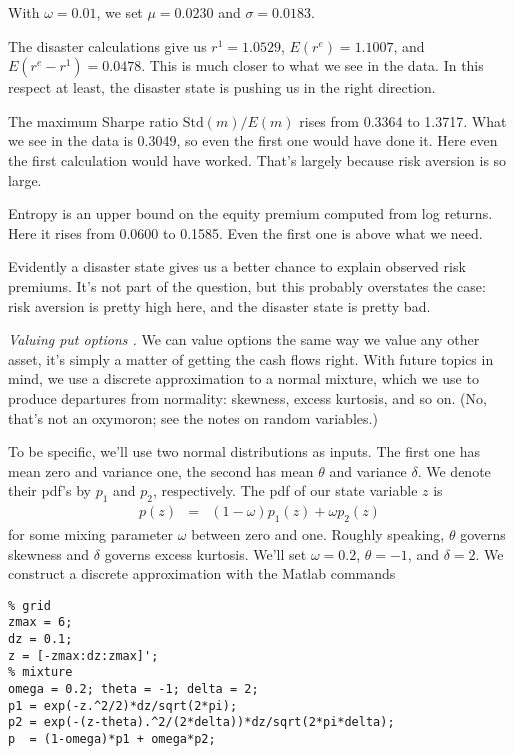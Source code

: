 \documentclass[11pt]{exam}
\begin{document}
\begin{questions}
\begin{solution}
\begin{parts}
\item With $\omega = 0.01$, we set
$ \mu = 0.0230$ and $\sigma = 0.0183$.


\item The disaster calculations give us
$r^1 = 1.0529$,
$ E(r^e) = 1.1007$, and $ E(r^e-r^1) = 0.0478$.
This is much closer to what we see in the data.
In this respect at least, the disaster state is pushing us in the right direction.

\item
The maximum Sharpe ratio $ \mbox{Std}(m)/E(m)$ rises from 0.3364 to 1.3717.
What we see in the data is 0.3049, so even the first one would have done it.
Here even the first calculation would have worked.
That's largely because risk aversion is so large.

\item Entropy is an upper bound on the equity premium computed from log returns.
Here it rises from 0.0600 to 0.1585.
Even the first one is above what we need.

\item Evidently a disaster state gives us a better chance to
explain observed risk premiums.
It's not part of the question, but this probably overstates the case:
risk aversion is pretty high here, and the disaster state is pretty bad.
\end{parts}
\end{solution}


\item {\it Valuing put options .\/}
We can value options the same way we value any other asset,
it's simply a matter of getting the cash flows right.
With future topics in mind,
we use a discrete approximation to a normal mixture,
which we use to produce departures from normality: skewness, excess kurtosis, and so on.
(No, that's not an oxymoron; see the notes on random variables.)

To be specific, we'll use two normal distributions as inputs.
The first one has mean zero and variance one,
the second has mean $\theta$ and variance $\delta$.
We denote their pdf's by $p_1$ and $p_2$, respectively.
The pdf of our state variable $z$ is
\begin{eqnarray*}
    p(z) &=& (1-\omega) p_1(z) + \omega p_2(z)
\end{eqnarray*}
for some mixing parameter $\omega$ between zero and one.
Roughly speaking, $\theta$ governs skewness and $\delta$ governs excess kurtosis.
We'll set $\omega = 0.2$, $\theta = -1$, and $\delta = 2$.
%
We construct a discrete approximation with the Matlab commands
\begin{verbatim}
% grid
zmax = 6;
dz = 0.1;
z = [-zmax:dz:zmax]';
% mixture
omega = 0.2; theta = -1; delta = 2;
p1 = exp(-z.^2/2)*dz/sqrt(2*pi);
p2 = exp(-(z-theta).^2/(2*delta))*dz/sqrt(2*pi*delta);
p  = (1-omega)*p1 + omega*p2;
\end{verbatim}



\end{questions}
\end{document}
